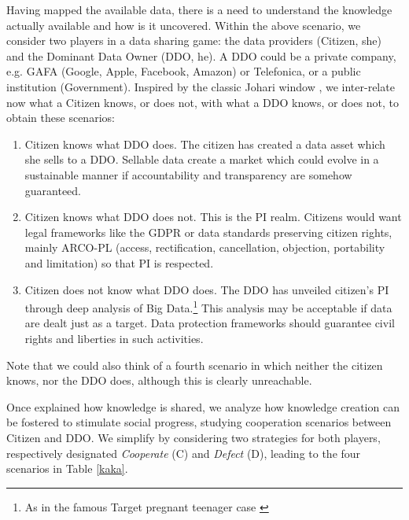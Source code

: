 Having mapped the available data, there is a need to understand the 
knowledge actually available and how is it uncovered.	
Within the above scenario, 
we consider two players in  a data 
sharing game: the data providers 
(Citizen, she) and the Dominant Data Owner (DDO, he).
A DDO could be a private
company, e.g. GAFA (Google, Apple, Facebook, Amazon) or Telefonica,
or a public institution (Government). 
Inspired by the classic Johari window \parencite{johari},
we inter-relate now what a Citizen knows, or does not,
with what a DDO knows, or does not,
to obtain these scenarios:
\begin{enumerate}
\item Citizen knows what DDO does.
The citizen has created 
a data asset which she sells to a DDO. 
Sellable data create a market which could 
evolve in a sustainable manner if accountability and transparency are somehow guaranteed.
\item 	Citizen knows what DDO does not.
This is the PI realm.
Citizens would want legal frameworks like the 
GDPR or data standards preserving  
citizen rights, mainly 
ARCO-PL (access, rectification, cancellation, objection, portability
and limitation) so that PI is respected.
\item Citizen does not know what DDO does. 
The DDO has unveiled
citizen’s PI through deep analysis of
Big Data.\footnote{As in the famous Target pregnant
teenager case \parencite{target}} 
This analysis may be acceptable if data are dealt just as a target.
Data protection frameworks should guarantee civil rights and liberties in such activities.
\end{enumerate}
Note that we could also think of a fourth scenario in which 
neither the citizen knows, nor the DDO does, although this is clearly unreachable. 

Once explained how knowledge is shared, we analyze how 
knowledge creation can be fostered to stimulate social progress, studying 
cooperation  scenarios between Citizen and DDO. 
We simplify by considering two strategies
for both players, respectively designated {\em Cooperate}  (C)
and {\em Defect} (D), leading to the four scenarios 
in Table
\ref{kaka}.

